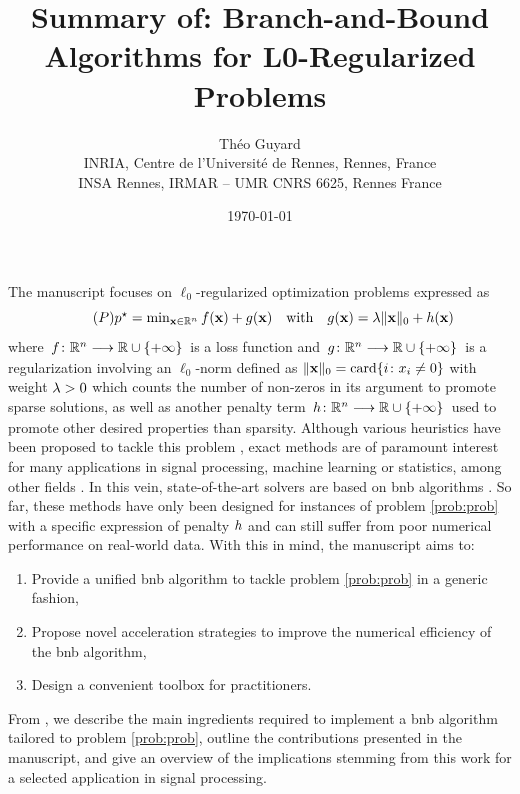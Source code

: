 \documentclass[11pt]{article}
\title{Summary of: Branch-and-Bound Algorithms for L0-Regularized Problems}
\author{Théo Guyard \\ INRIA, Centre de l'Université de Rennes, Rennes, France \\ INSA Rennes, IRMAR -- UMR CNRS 6625, Rennes France}
\date{\today}
\begin{document}
 

\maketitle

The manuscript focuses on $\ell_0$-regularized optimization problems expressed as
\begin{equation}
    \label{prob:prob}
    \tag{$\ppb$}
    \textstyle
    \opt{\pobj} = \min_{\pv \in \kR^{\pdim}} \lfunc(\pv) + \rfunc(\pv)
    \quad\text{with}\quad
    \rfunc(\pv) = \reg\norm{\pv}{0} + \pfunc(\pv)
\end{equation}
where $\kfuncdef{\lfunc}{\kR^{\pdim}}{\kR \cup \{+\infty\}}$ is a loss function and $\kfuncdef{\rfunc}{\kR^{\pdim}}{\kR \cup \{+\infty\}}$ is a regularization involving an $\ell_0$-norm defined as $\norm{\pv}{0} = \mathrm{card}{\kset{\idxentry}{\pvi{\idxentry} \neq 0}}$ with weight $\lambda > 0$ which counts the number of non-zeros in its argument to promote sparse solutions, as well as another penalty term $\kfuncdef{\pfunc}{\kR^{\pdim}}{\kR \cup \{+\infty\}}$ used to promote other desired properties than sparsity.
Although various heuristics have been proposed to tackle this problem \cite{tropp2010computational}, exact methods are of paramount interest for many applications in signal processing, machine learning or statistics, among other fields \citep{tillmann2021cardinality,bertsimas2016best}.
In this vein, state-of-the-art solvers are based on \gls{bnb} algorithms \citep{ben2022global,hazimeh2022sparse}.
So far, these methods have only been designed for instances of problem \eqref{prob:prob} with a specific expression of penalty $h$ and can still suffer from poor numerical performance on real-world data.
With this in mind, the manuscript aims to:
\begin{enumerate}[nosep, label=\arabic*.]
    \item Provide a unified \gls{bnb} algorithm to tackle problem \eqref{prob:prob} in a generic fashion,
    \item Propose novel acceleration strategies to improve the numerical efficiency of the \gls{bnb} algorithm,
    \item Design a convenient toolbox for practitioners.
\end{enumerate} 
From , we describe the main ingredients required to implement a \gls{bnb} algorithm tailored to problem \eqref{prob:prob}, outline the contributions presented in the manuscript, and give an overview of the implications stemming from this work for a selected application in signal processing.
\end{document}

